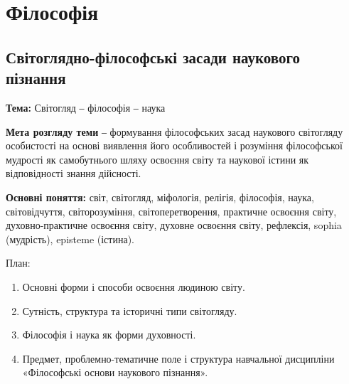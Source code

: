 \chapter{Філософія}
\minitoc


\section{Світоглядно-філософські засади наукового пізнання}

\textbf{Тема:} Світогляд ‒ філософія ‒ наука

\textbf{Мета розгляду теми} ‒ формування філософських засад наукового
світогляду особистості на основі виявлення його особливостей і розуміння
філософської мудрості як самобутнього шляху освоєння світу та наукової
істини як відповідності знання дійсності.

\textbf{Основні поняття:} світ, світогляд, міфологія, релігія, філософія, наука,
світовідчуття, світорозуміння, світоперетворення, практичне освоєння світу,
духовно-практичне освоєння світу, духовне освоєння світу, рефлексія, sophia
(мудрість), episteme (істина).

План:
\begin{enumerate}
\item Основні форми і способи освоєння людиною світу.
\item Сутність, структура та історичні типи світогляду.
\item Філософія і наука як форми духовності.
\item Предмет, проблемно-тематичне поле і структура навчальної дисципліни
	«Філософські основи наукового пізнання».
\end{enumerate}

